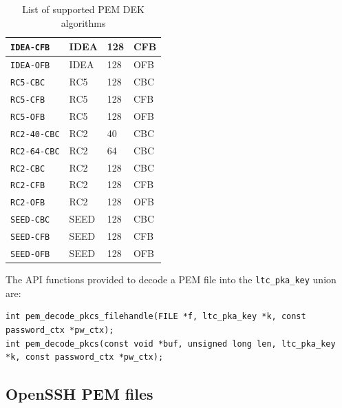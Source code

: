 \documentclass[synpaper]{book}
\begin{document}
\begin{table}[H]
\begin{small}
\begin{tabular}{|l|l|l|l|}
\hline \texttt{IDEA-CFB}          & IDEA            & 128                       & CFB    \\
\hline \texttt{IDEA-OFB}          & IDEA            & 128                       & OFB    \\
\hline \texttt{RC5-CBC}           & RC5             & 128                       & CBC    \\
\hline \texttt{RC5-CFB}           & RC5             & 128                       & CFB    \\
\hline \texttt{RC5-OFB}           & RC5             & 128                       & OFB    \\
\hline \texttt{RC2-40-CBC}        & RC2             & 40                        & CBC    \\
\hline \texttt{RC2-64-CBC}        & RC2             & 64                        & CBC    \\
\hline \texttt{RC2-CBC}           & RC2             & 128                       & CBC    \\
\hline \texttt{RC2-CFB}           & RC2             & 128                       & CFB    \\
\hline \texttt{RC2-OFB}           & RC2             & 128                       & OFB    \\
\hline \texttt{SEED-CBC}          & SEED            & 128                       & CBC    \\
\hline \texttt{SEED-CFB}          & SEED            & 128                       & CFB    \\
\hline \texttt{SEED-OFB}          & SEED            & 128                       & OFB    \\
\hline
\end{tabular}
\end{small}
\caption{List of supported PEM DEK algorithms}
\label{supported-pem-dek-algorithms}
\end{table}

The API functions provided to decode a PEM file into the \texttt{ltc\_pka\_key} union are:

\begin{verbatim}
int pem_decode_pkcs_filehandle(FILE *f, ltc_pka_key *k, const password_ctx *pw_ctx);
int pem_decode_pkcs(const void *buf, unsigned long len, ltc_pka_key *k, const password_ctx *pw_ctx);
\end{verbatim}

\subsection{OpenSSH PEM files}
\end{document}
